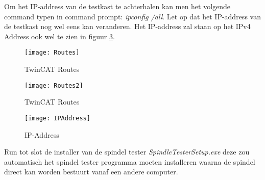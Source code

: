 \vspace{0.5cm}

Om het IP-address van de testkast te achterhalen kan men het volgende command typen in command prompt: \textit{ipconfig /all}. Let op dat het IP-address van de testkast nog wel eens kan veranderen. Het IP-address zal staan op het IPv4 Address ook wel te zien in figuur \ref{fig:IPAddress}.

 \begin{figure}[H]
 	\centering
 	\texttt{[image: Routes]}
 	\caption{\gls{TwinCAT} Routes}
 	\label{fig:Routes}
 \end{figure}
 
 \begin{figure}[H]
 	\centering
 	\texttt{[image: Routes2]}
 	\caption{\gls{TwinCAT} Routes}
 	\label{fig:Routes2}
 \end{figure}
 
  \begin{figure}[H]
 	\centering
 	\texttt{[image: IPAddress]}
 	\caption{IP-Address}
 	\label{fig:IPAddress}
 \end{figure}
 
 Run tot slot de installer van de spindel tester \textit{SpindleTesterSetup.exe} deze zou automatisch het spindel tester programma moeten installeren waarna de spindel direct kan worden bestuurt vanaf een andere computer.
 
 
	
